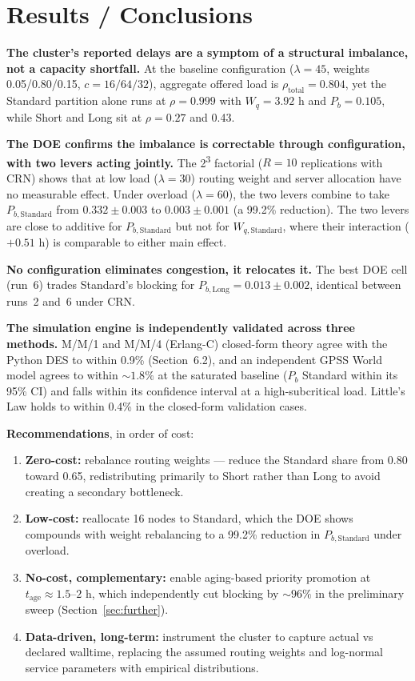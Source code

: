 \documentclass[11pt,a4paper]{article}
\newcommand{\Wq}{\ensuremath{W_q}}
\newcommand{\Pb}{\ensuremath{P_b}}
\newcommand{\lam}{\ensuremath{\lambda}}
\begin{document}
\section{Results / Conclusions}

\textbf{The cluster's reported delays are a symptom of a structural imbalance, not a capacity shortfall.}
At the baseline configuration ($\lam=45$, weights 0.05/0.80/0.15, $c=16/64/32$), aggregate offered
load is $\rho_\text{total}=0.804$, yet the Standard partition alone runs at $\rho=0.999$ with
$\Wq=3.92$ h and $\Pb=0.105$, while Short and Long sit at $\rho=0.27$ and 0.43.

\textbf{The DOE confirms the imbalance is correctable through configuration, with two levers acting
jointly.} The 2\textsuperscript{3} factorial ($R=10$ replications with CRN) shows that at low load
($\lam=30$) routing weight and server allocation have no measurable effect. Under overload ($\lam=60$),
the two levers combine to take $P_{b,\text{Standard}}$ from $0.332 \pm 0.003$ to $0.003 \pm 0.001$
(a 99.2\% reduction). The two levers are close to additive for $P_{b,\text{Standard}}$ but not for
$W_{q,\text{Standard}}$, where their interaction ($+0.51$ h) is comparable to either main effect.

\textbf{No configuration eliminates congestion, it relocates it.} The best DOE cell (run~6) trades
Standard's blocking for $P_{b,\text{Long}} = 0.013 \pm 0.002$, identical between runs~2 and~6 under CRN.

\textbf{The simulation engine is independently validated across three methods.} M/M/1 and M/M/4
(Erlang-C) closed-form theory agree with the Python DES to within 0.9\% (Section~6.2), and an
independent GPSS World model agrees to within ${\sim}1.8\%$ at the saturated baseline ($\Pb$ Standard
within its 95\% CI) and falls within its confidence interval at a high-subcritical load. Little's Law
holds to within 0.4\% in the closed-form validation cases.

\textbf{Recommendations}, in order of cost:
\begin{enumerate}
  \item \textbf{Zero-cost:} rebalance routing weights --- reduce the Standard share from 0.80 toward
  0.65, redistributing primarily to Short rather than Long to avoid creating a secondary bottleneck.
  \item \textbf{Low-cost:} reallocate 16 nodes to Standard, which the DOE shows compounds with weight
  rebalancing to a 99.2\% reduction in $P_{b,\text{Standard}}$ under overload.
  \item \textbf{No-cost, complementary:} enable aging-based priority promotion at $t_\text{age} \approx
  1.5$--$2$ h, which independently cut blocking by ${\sim}96\%$ in the preliminary sweep (Section~\ref{sec:further}).
  \item \textbf{Data-driven, long-term:} instrument the cluster to capture actual vs declared walltime,
  replacing the assumed routing weights and log-normal service parameters with empirical distributions.
\end{enumerate}
\end{document}
